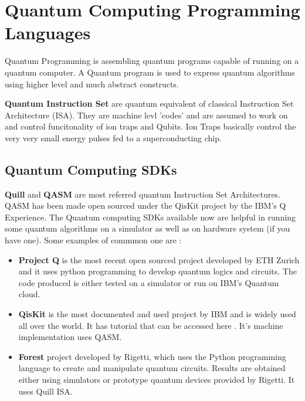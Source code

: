 \chapter{Quantum Computing Programming Languages}
Quantum Programming is assembling quantum programs capable of running on a quantum computer. A Quantum program is used to express quantum algorithms using higher level and much abstract constructs.

\textbf{Quantum Instruction Set} are quantum equivalent of classical Instruction Set Architecture (ISA). They are machine levl 'codes' and are assumed to work on and control funcitonality of ion traps and Qubits. Ion Traps basically control the very very small energy pulses fed to a superconducting chip.\\ 

\section{Quantum Computing SDKs}
\textbf{Quill} and \textbf{QASM} are most referred quantum Instruction Set Architectures. QASM has been made open sourced under the QisKit project by the IBM's Q Experience. The Quantum computing SDKs available now are helpful in running some quantum algorithms on a simulator as well as on hardware system (if you have one). Some examples of commmon one are :

\begin{itemize}
\item{
	\textbf{Project Q} is the most recent open sourced project developed by ETH Zurich and it uses python programming to develop quantum logics and circuits. The code produced is either tested on a simulator or run on IBM's Quantum cloud.
}
\item{
	\textbf{QisKit} is the most documented and used project by IBM and is widely used all over the world. It has tutorial that can be accessed here \cite{einstein}. It's machine implementation uses QASM.
}
\item{
	\textbf{Forest} project developed by Rigetti, which uses the Python programming language to create and manipulate quantum circuits. Results are obtained either using simulators or prototype quantum devices provided by Rigetti. It uses Quill ISA.
}
\end{itemize}

